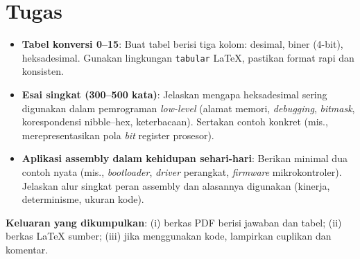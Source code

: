 \section{Tugas}
\begin{itemize}
    \item \textbf{Tabel konversi 0--15}: Buat tabel berisi tiga kolom: desimal, biner (4-bit), heksadesimal. Gunakan lingkungan \texttt{tabular} LaTeX, pastikan format rapi dan konsisten.
    \item \textbf{Esai singkat (300--500 kata)}: Jelaskan mengapa heksadesimal sering digunakan dalam pemrograman \textit{low-level} (alamat memori, \textit{debugging}, \textit{bitmask}, korespondensi nibble--hex, keterbacaan). Sertakan contoh konkret (mis., merepresentasikan pola \textit{bit} register prosesor).
    \item \textbf{Aplikasi assembly dalam kehidupan sehari-hari}: Berikan minimal dua contoh nyata (mis., \textit{bootloader}, \textit{driver} perangkat, \textit{firmware} mikrokontroler). Jelaskan alur singkat peran assembly dan alasannya digunakan (kinerja, determinisme, ukuran kode).
\end{itemize}
\noindent\textbf{Keluaran yang dikumpulkan}: 
(i) berkas PDF berisi jawaban dan tabel; 
(ii) berkas \LaTeX{} sumber; 
(iii) jika menggunakan kode, lampirkan cuplikan dan komentar.
